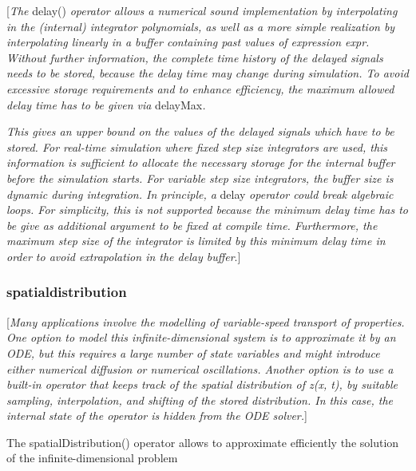 \documentclass[10pt,a4paper]{report}
\def\doublelabel#1{\label{#1}}
\begin{document}
{[}\emph{The} delay() \emph{operator allows a numerical sound
implementation by interpolating in the (internal) integrator
polynomials, as well as a more simple realization by interpolating
linearly in a buffer containing past values of expression expr. Without
further information, the complete time history of the delayed signals
needs to be stored, because the delay time may change during simulation.
To avoid excessive storage requirements and to enhance efficiency, the
maximum allowed delay time has to be given via} delayMax\emph{. }

\emph{This gives an upper bound on the values of the delayed signals
which have to be stored. For real-time simulation where fixed step size
integrators are used, this information is sufficient to allocate the
necessary storage for the internal buffer before the simulation starts.
For variable step size integrators, the buffer size is dynamic during
integration. In principle, a} delay \emph{operator could break algebraic
loops. For simplicity, this is not supported because the minimum delay
time has to be give as additional argument to be fixed at compile time.
Furthermore, the maximum step size of the integrator is limited by this
minimum delay time in order to avoid extrapolation in the delay
buffer}.{]}

\subsubsection{spatialdistribution}\doublelabel{spatialdistribution}

{[}\emph{Many applications involve the modelling of variable-speed
transport of properties. One option to model this infinite-dimensional
system is to approximate it by an ODE, but this requires a large number
of state variables and might introduce either numerical diffusion or
numerical oscillations. Another option is to use a built-in operator
that keeps track of the spatial distribution of z(x, t), by suitable
sampling, interpolation, and shifting of the stored distribution. In
this case, the internal state of the operator is hidden from the ODE
solver.}{]}

The spatialDistribution() operator allows to approximate efficiently the
solution of the infinite-dimensional problem
\end{document}

